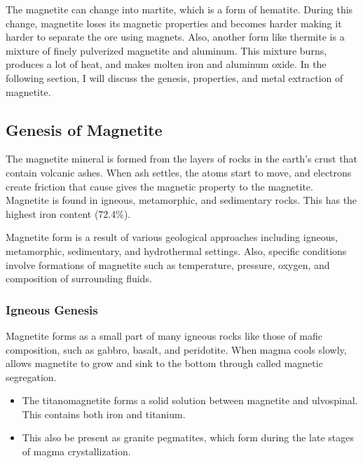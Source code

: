 \documentclass[12pt,a4paper, top=1.9cm, bottom=2.03cm, left=3.81cm, right=1.9cm]{article}
\begin{document}
\vspace{1cm}
\noindent\fontsize{12}{14}\selectfont The magnetite can change into martite, which is a form of hematite. During this change, magnetite loses its magnetic properties and becomes harder making it harder to separate the ore using magnets. Also, another form like thermite is a mixture of finely pulverized magnetite and aluminum. This mixture burns, produces a lot of heat, and makes molten iron and aluminum oxide. In the following section, I will discuss the genesis, properties, and metal extraction of magnetite.
\newpage
\subsection{Genesis of Magnetite}
\noindent\fontsize{12}{14}\selectfont The magnetite mineral is formed from the layers of rocks in the earth’s crust that contain volcanic ashes. When ash settles, the atoms start to move, and electrons create friction that cause gives the magnetic property to the magnetite. Magnetite is found in igneous, metamorphic, and sedimentary rocks. This has the highest iron content (72.4\%). 

\noindent\fontsize{12}{14}\selectfont Magnetite form is a result of various geological approaches including igneous, metamorphic, sedimentary, and hydrothermal settings. Also, specific conditions involve formations of magnetite such as temperature, pressure, oxygen, and composition of surrounding fluids. 
\subsubsection{Igneous Genesis}
\noindent\fontsize{12}{14}\selectfont Magnetite forms as a small part of many igneous rocks like those of mafic composition, such as gabbro, basalt, and peridotite. When magma cools slowly, allows magnetite to grow and sink to the bottom through called magnetic segregation.
\begin{itemize}[label=\textbullet]  %
\item The titanomagnetite forms a solid solution between magnetite and ulvospinal. This contains both iron and titanium.
\item This also be present as granite pegmatites, which form during the late stages of magma crystallization.
\end{itemize}
\end{document}
